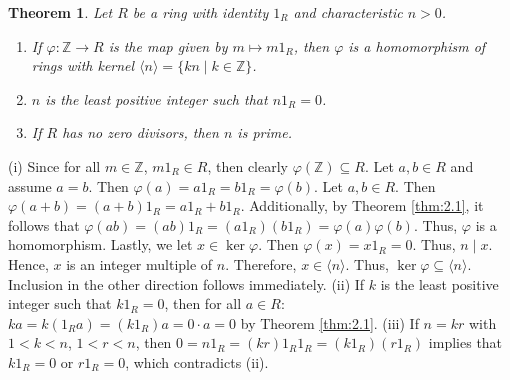 \documentclass{article}
\makeatletter
\newtheorem{theorem}{Theorem}[section]
\theoremstyle{definition}
\theoremstyle{remark}
\let\oldproofname=\proofname
\renewcommand{\proofname}{\bf{\textit{\oldproofname}}}
\theoremstyle{definition}
\renewenvironment{proof}[1][\proofname]{\par
  \pushQED{\qed}%
  \normalfont \topsep6\p@\@plus6\p@\relax
  \list{}{\leftmargin=0mm
          \rightmargin=0mm
          \settowidth{\itemindent}{\itshape#1}%
          \labelwidth=4mm
          \parsep=0pt \listparindent=0mm%
  }
  \item[\hskip\labelsep
        \itshape
    #1\@addpunct{.}]\ignorespaces
}{%
  \popQED\endlist\@endpefalse
}
\makeatother
\begin{document}
    \begin{theorem}\label{thm:2.2} Let $R$ be a ring with identity $1_R$ and characteristic $n>0$.
        \begin{enumerate}[label=(\roman*)]
            \item If $\varphi\colon \mathbb{Z}\rightarrow R$ is the map given by $m\mapsto m1_R$, then $\varphi$ is a homomorphism of rings with kernel $\langle n\rangle=\{kn\mid k\in\mathbb{Z}\}$.
            
            \item $n$ is the least positive integer such that $n1_R=0$.
            
            \item If $R$ has no zero divisors, then $n$ is prime.
        \end{enumerate}
    \end{theorem}
        \begin{proof}
            (i) Since for all $m\in\mathbb{Z}$, $m1_R\in R$, then clearly $\varphi(\mathbb{Z})\subseteq R$. Let $a,b\in R$ and assume $a=b$. Then $\varphi(a)=a1_R=b1_R=\varphi(b)$. Let $a,b\in R$. Then $\varphi(a+b)=(a+b)1_R=a1_R+b1_R$. Additionally, by Theorem \ref{thm:2.1}, it follows that $\varphi(ab)=(ab)1_R=(a1_R)(b1_R)=\varphi(a)\varphi(b)$. Thus, $\varphi$ is a homomorphism. Lastly, we let $x\in\ker\varphi$. Then $\varphi(x)=x1_R=0$. Thus, $n\mid x$. Hence, $x$ is an integer multiple of $n$. Therefore, $x\in\langle n\rangle$. Thus, $\ker\varphi\subseteq\langle n\rangle$. Inclusion in the other direction follows immediately. (ii) If $k$ is the least positive integer such that $k1_R=0$, then for all $a\in R$: $ka=k(1_Ra)=(k1_R)a=0\cdot a=0$ by Theorem \ref{thm:2.1}. (iii) If $n=kr$ with $1<k<n$, $1<r<n$, then $0=n1_R=(kr)1_R1_R=(k1_R)(r1_R)$ implies that $k1_R=0$ or $r1_R=0$, which contradicts (ii). 
        \end{proof}
    
\end{document}
